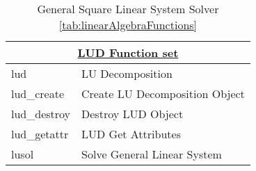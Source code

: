 \begin{table}[H]
\caption{General Square Linear System Solver \ref{tab:linearAlgebraFunctions}}
\label{tab:generalSquareSolver}
\begin{center}
\begin{tabular}{|l|l|}
\multicolumn{2}{c}{\hyperlink{ludFunc}{\rmfamily \bfseries LUD Function set}}\\
\hline
lud & LU Decomposition\\
lud\_create & Create LU Decomposition Object \\
lud\_destroy & Destroy LUD Object \\
lud\_getattr & LUD Get Attributes\\
lusol & Solve General Linear System \\
\hline\end{tabular}
\end{center}
\label{default}
\end{table}%
